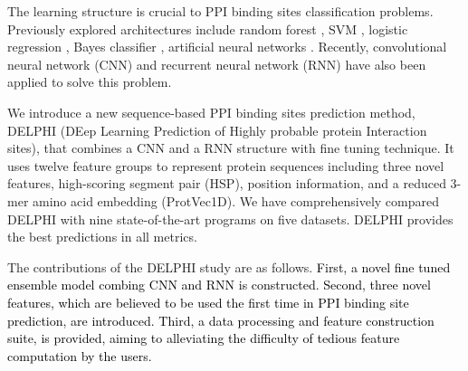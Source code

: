\documentclass{bioinfo}
\newcommand{\myColor}{black}
\begin{document}
The learning structure is crucial to PPI binding sites classification problems. Previously explored architectures include random forest \citep{wei2016protein, wang2019protein}, SVM \citep{wei2016protein}, logistic regression \citep{zhang2019scriber}, Bayes classifier \citep{murakami2010applying}, artificial neural networks \citep{singh2014springs}. Recently, convolutional neural network (CNN) \citep{zeng2019protein} and recurrent neural network (RNN) \citep{zhang2019sequence} have also been applied to solve this problem. 

We introduce a new sequence-based PPI binding sites prediction method, DELPHI (DEep Learning Prediction of Highly probable protein Interaction sites), that combines a CNN and a RNN structure with fine tuning technique. It uses twelve feature groups to represent protein sequences including three novel features, high-scoring segment pair (HSP), position information, and a reduced 3-mer amino acid embedding (ProtVec1D). We have comprehensively compared DELPHI with nine state-of-the-art programs on five datasets. DELPHI provides the best predictions in all metrics. 

The contributions of the DELPHI study are as follows. \textcolor{\myColor}{
First, a novel fine tuned ensemble model combing CNN and RNN is constructed. Second, three novel features, which are believed to be used the first time in PPI binding site prediction, are introduced. Third, a data processing and feature construction suite, is provided, aiming to alleviating the difficulty of tedious feature computation by the users.}
\end{document}
